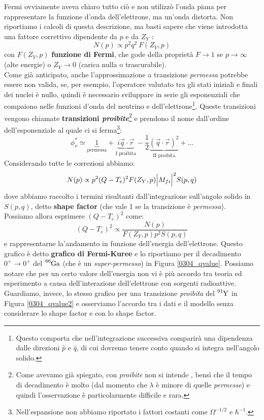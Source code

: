 \noindent Fermi ovviamente aveva chiaro tutto ciò e non utilizzò l'onda piana per rappresentare la funzione d'onda dell'elettrone, ma un'onda distorta. Non riportiamo i calcoli di questa descrizione, ma basti sapere che viene introdotta una fattore correttivo dipendente da $p$ e da $Z_Y$ :
$$N(p)\propto p^2q^2\: F(Z_Y,p)$$
con $F(Z_Y,p)$ \textbf{funzione di Fermi}, che gode della proprietà $F\to 1$ se $p\to\infty$ (alte energie) o $Z_Y\to0$ (carica nulla o trascurabile).\\
Come già anticipato, anche l'approssimazione a transizione \textit{permessa} potrebbe essere non valida, se, per esempio, l'operatore valutato tra gli stati iniziali e finali dei nuclei è nullo, quindi è necessario sviluppare in serie gli esponenziali che compaiono nelle funzioni d'onda del neutrino e dell'elettrone\footnote{Questo comporta che nell'integrazione successiva comparirà una dipendenza dalle direzioni $\hat{p}$ e $\hat{q}$, di cui dovremo tenere conto quando si integra nell'angolo solido.}. Queste transizioni vengono chiamate \textbf{transizioni \textit{proibite}}\footnote{Come avevamo già spiegato, con \textit{proibite} non si intende , bensì che il tempo di decadimento è molto  (dal momento che $\lambda$ è minore di quelle \textit{permesse}) e quindi l'osservazione è particolarmente difficile e rara.} e prendono il nome dall'ordine dell'esponenziale al quale ci si ferma\footnote{Nell'espansione non abbiamo riportato i fattori costanti come $\Omega^{-1/2}$ e $\hbar^{-1}$.}:
$$\phi_\nu^* \simeq \underbrace{1}_\text{permessa}+\underbrace{i\vec{q}\cdot \vec{r}}_\text{I proibita}-\frac{1}{2}\underbrace{(\vec{q}\cdot \vec{r})^2}_\text{II proibita}+\dots$$
Considerando tutte le correzioni abbiamo:
$$N(p)\propto p^2(Q-T_e)^2 F(Z_Y,p)\Bigl |M_{fi}\Bigl |^2 S(p,q)$$
dove abbiamo raccolto i termini risultanti dall'integrazione sull'angolo solido in $S(p,q)$, detto \textbf{shape factor} (che vale 1 se la transizione è \textit{permessa}).\\
Possiamo allora esprimere $(Q-T_e)^2$ come:
$$(Q-T_e)^2\propto\frac{N(p)}{F(Z_Y,p)p^2 S(p,q)}$$
e rappresentarne la'andamento in funzione dell'energia dell'elettrone. Questo grafico è detto \textbf{grafico di Fermi-Kuree} e lo riportiamo per il decadimento $0^+\to0^+$ del $\ce{^{66}Ga}$ (che è un \textit{super-permesso}) in Figura \ref{0304_qvalue}. Possiamo notare che per un certo valore dell'energia non vi è più accordo tra teoria ed esperimento a causa dell'interazione dell'elettrone con sorgenti radioattive.\\
Guardiamo, invece, lo stesso grafico per una transizione \textit{proibita} del $\ce{^{91}Y}$ in Figura \ref{0304_qvalue2} e osserviamo l'accordo tra i dati e il modello senza considerare lo shape factor e con lo shape factor.

